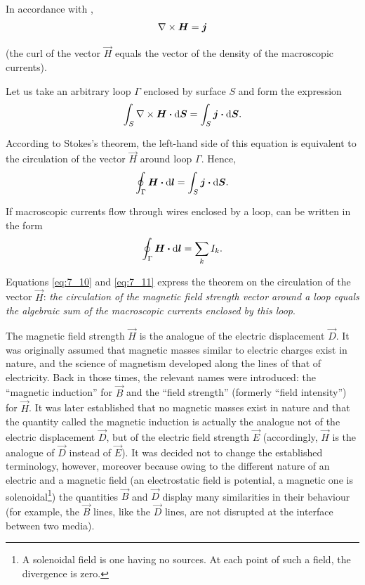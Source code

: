 In accordance with ,
\begin{equation}\label{eq:7_9}
    \nabla\times\boldsymbol{H} = \boldsymbol{j}
\end{equation}

\noindent
(the curl of the vector $\vec{H}$ equals the vector of the density of the macroscopic currents).

Let us take an arbitrary loop $\Gamma$ enclosed by surface $S$ and form the expression
\begin{equation*}
    \int_S \nabla\times\boldsymbol{H} \boldsymbol{\cdot} \mathrm{d}\boldsymbol{S} = \int_S \boldsymbol{j} \boldsymbol{\cdot} \mathrm{d}\boldsymbol{S}.
\end{equation*}

\noindent
According to Stokes's theorem, the left-hand side of this equation is equivalent to the circulation of the vector $\vec{H}$ around loop $\Gamma$.
Hence,
\begin{equation}\label{eq:7_10}
    \oint_{\Gamma} \boldsymbol{H} \boldsymbol{\cdot} \mathrm{d}\boldsymbol{l} = \int_S \boldsymbol{j} \boldsymbol{\cdot} \mathrm{d}\boldsymbol{S}.
\end{equation}

\noindent
If macroscopic currents flow through wires enclosed by a loop,  can be written in the form
\begin{equation}\label{eq:7_11}
    \oint_{\Gamma} \boldsymbol{H} \boldsymbol{\cdot} \mathrm{d}\boldsymbol{l} = \sum_k I_k.
\end{equation}

\noindent
Equations \eqref{eq:7_10} and \eqref{eq:7_11} express the theorem on the circulation of the vector $\vec{H}$: \textit{the circulation of the magnetic field strength vector around a loop equals the algebraic sum of the macroscopic currents enclosed by this loop}.

The magnetic field strength $\vec{H}$ is the analogue of the electric displacement $\vec{D}$.
It was originally assumed that magnetic masses similar to electric charges exist in nature, and the science of magnetism developed along the lines of that of electricity.
Back in those times, the relevant names were introduced: the ``magnetic induction'' for $\vec{B}$ and the ``field strength'' (formerly ``field intensity'') for $\vec{H}$.
It was later established that no magnetic masses exist in nature and that the quantity called the magnetic induction is actually the analogue not of the electric displacement $\vec{D}$, but of the electric field strength $\vec{E}$ (accordingly, $\vec{H}$ is the analogue of $\vec{D}$ instead of $\vec{E}$).
It was decided not to change the established terminology, however, moreover because owing to the different nature of an electric and a magnetic field (an electrostatic field is potential, a magnetic one is solenoidal\footnote{A solenoidal field is one having no sources. At each point of such a field,
the divergence is zero.}) the quantities $\vec{B}$ and $\vec{D}$ display many similarities in their behaviour (for example, the $\vec{B}$ lines, like the $\vec{D}$ lines, are not disrupted at the interface between two media).


